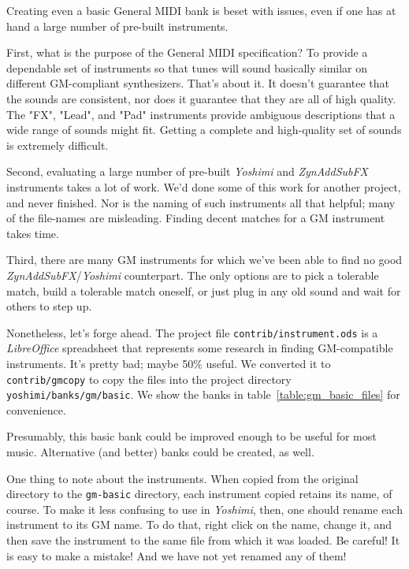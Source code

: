    Creating even a basic General MIDI bank is beset with issues, even if one
   has at hand a large number of pre-built instruments.

   First, what is the purpose of the General MIDI specification?
   To provide a
   dependable set of instruments so that tunes will sound basically similar
   on different GM-compliant synthesizers.  That's about it.  It doesn't
   guarantee that the sounds are consistent, nor does it guarantee that they
   are all of high quality.  The "FX", "Lead", and "Pad" instruments provide
   ambiguous descriptions that a wide range of sounds might fit.
   Getting a complete and high-quality set of sounds is extremely difficult.

   Second, evaluating a large number of pre-built \textsl{Yoshimi} and
   \textsl{ZynAddSubFX} instruments takes a lot of
   work.  We'd done some of this work for another project, and never
   finished.  Nor is the naming of such instruments all that helpful; many
   of the file-names are misleading.  Finding decent matches for a GM
   instrument takes time.

   Third, there are many GM instruments for which we've been able to find no
   good \textsl{ZynAddSubFX}/\textsl{Yoshimi} counterpart.  The only options
   are to pick a tolerable match, build a tolerable match oneself, or just
   plug in any old sound and wait for others to step up.

   Nonetheless, let's forge ahead.  The project file
   \texttt{contrib/instrument.ods}
   is a \textsl{LibreOffice} spreadsheet
   that represents some research in finding GM-compatible instruments.
   It's pretty bad; maybe 50\% useful.
   We converted it to \texttt{contrib/gmcopy} to copy the files
   into the project directory \texttt{yoshimi/banks/gm/basic}.
   We show the banks in table~\ref{table:gm_basic_files}
   for convenience.




   Presumably, this basic bank could be improved enough to be useful
   for most music.  Alternative (and better) banks could be created, as
   well.

   One thing to note about the instruments.  When copied from the original
   directory to the \texttt{gm-basic} directory, each instrument copied
   retains its name, of course.  To make it less confusing to use in
   \textsl{Yoshimi}, then, one should rename each instrument to its GM name.
   To do that, right click on the name, change it, and then save the
   instrument to the same file from which it was loaded.  Be careful!
   It is easy to make a mistake!  
   And we have not yet renamed any of them!

